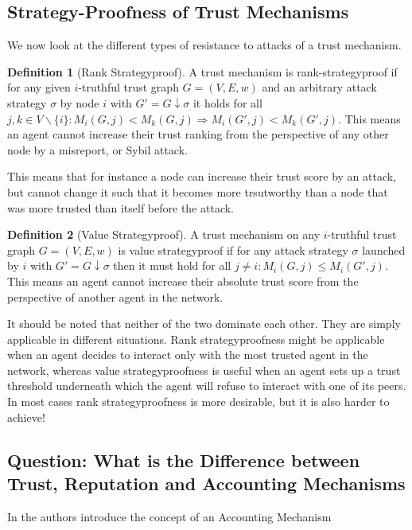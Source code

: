 \documentclass[11pt,a4paper]{report}
\theoremstyle{definition}
\newtheorem{definition}{Definition}[section]
\theoremstyle{theorem}
\theoremstyle{proposition}
\theoremstyle{corollary}
\theoremstyle{lemma}
\theoremstyle{example}
\theoremstyle{remark}
\begin{document}
\subsection{Strategy-Proofness of Trust Mechanisms}
\label{subsec:Strategy-Proofness of Trust Mechanisms}
We now look at the different types of resistance to attacks of a trust mechanism.
\begin{definition}[Rank Strategyproof]
A trust mechanism is rank-strategyproof if for any given $i$-truthful trust graph $G=(V,E,w)$ and an arbitrary attack strategy $\sigma$ by node $i$ with $G'=G\downarrow\sigma$ it holds for all $j,k\in{}V\backslash\{i\}: M_i(G,j)<M_k(G,j) \Rightarrow M_i(G',j)<M_k(G',j)$. This means an agent cannot increase their trust ranking from the perspective of any other node by a misreport, or Sybil attack.
\end{definition}
This means that for instance a node can increase their trust score by an attack, but cannot change it such that it becomes more trsutworthy than a node that was more trusted than itself before the attack. 

\begin{definition}[Value Strategyproof]
A trust mechanism on any $i$-truthful trust graph $G=(V,E,w)$ is value strategyproof if for any attack strategy $\sigma$ launched by $i$ with $G'=G\downarrow\sigma$ then it must hold for all $j\neq{}i: M_i(G,j)\leq{}M_i(G',j)$. This means an agent cannot increase their absolute trust score from the perspective of another agent in the network.
\end{definition}

\noindent{} It should be noted that neither of the two dominate each other. They are simply applicable in different situations. Rank strategyproofness might be applicable when an agent decides to interact only with the most trusted agent in the network, whereas value strategyproofness is useful when an agent sets up a trust threshold underneath which the agent will refuse to interact with one of its peers. In most cases rank strategyproofness is more desirable, but it is also harder to achieve!   

\subsection{Question: What is the Difference between Trust, Reputation and Accounting Mechanisms}
\label{subsec:Trust, Reputation, Accounting Mechanisms}
In \cite{On the Sybil-Proofness of Accounting Mechanisms} the authors introduce the concept of an Accounting Mechanism
\end{document}
